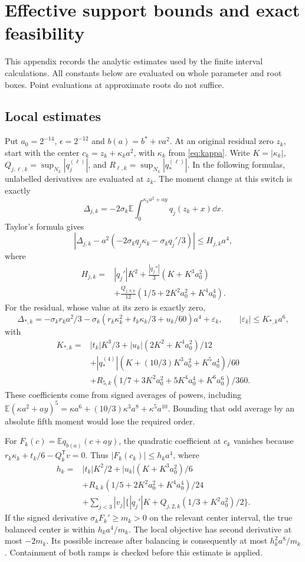 \section{Effective support bounds and exact feasibility}\label{app:effective}
This appendix records the analytic estimates used by the finite interval
calculations. All constants below are evaluated on whole parameter and root
boxes. Point evaluations at approximate roots do not suffice.

\subsection{Local estimates}
Put \(a_0=2^{-14}\), \(\epsilon=2^{-12}\) and
\(b(a)=b^*+va^2\). At an original residual zero \(z_k\), start with the
center \(c_k=z_k+\kappa_ka^2\), with \(\kappa_k\) from \eqref{eq:kappa}.
Write \(K=|\kappa_k|\),
\(Q_{j,\ell,k}=\sup_{N_k}|q_j^{(\ell)}|\), and
\(R_{\ell,k}=\sup_{N_k}|q_*^{(\ell)}|\).
In the following formulas, unlabelled derivatives are evaluated at \(z_k\).
The moment change at this switch is exactly
\[
 \Delta_{j,k}=-2\sigma_k\mathbb E
                 \int_0^{\kappa_ka^2+ay}q_j(z_k+x)\dd x .
\]
Taylor's formula gives
\[
 |\Delta_{j,k}-a^2(-2\sigma_kq_j\kappa_k-\sigma_kq_j'/3)|
                  \leq H_{j,k}a^4 ,
\]
where
\begin{align*}
 H_{j,k}={}&|q_j'|K^2
 +\frac{|q_j''|}{3}(K+K^3a_0^2)\\
 &+\frac{Q_{j,3,k}}{12}(1/5+2K^2a_0^2+K^4a_0^4).
\end{align*}
For the residual, whose value at its zero is exactly zero,
\[
 \Delta_{*,k}=-\sigma_kr_ka^2/3
 -\sigma_k(r_k\kappa_k^2+t_k\kappa_k/3+u_k/60)a^4+\varepsilon_k,
 \qquad |\varepsilon_k|\leq K_{*,k}a^6,
\]
with
\begin{align*}
 K_{*,k}={}&|t_k|K^3/3+|u_k|(2K^2+K^4a_0^2)/12\\
 &+|q_*^{(4)}|(K+(10/3)K^3a_0^2+K^5a_0^4)/60\\
 &+R_{5,k}(1/7+3K^2a_0^2+5K^4a_0^4+K^6a_0^6)/360 .
\end{align*}
These coefficients come from signed averages of powers, including
\(\mathbb E(\kappa a^2+ay)^5=\kappa a^6+(10/3)\kappa^3a^8+\kappa^5a^{10}\).
Bounding that odd average by an absolute fifth moment would lose the
required order.

For \(F_k(c)=\mathbb E q_{b(a)}(c+ay)\), the quadratic coefficient at
\(c_k\) vanishes because \(r_k\kappa_k+t_k/6-Q_k^{\mathsf T}v=0\).
Thus \(|F_k(c_k)|\leq h_ka^4\), where
\begin{align*}
 h_k={}&|t_k|K^2/2+|u_k|(K+K^3a_0^2)/6\\
 &+R_{4,k}(1/5+2K^2a_0^2+K^4a_0^4)/24\\
 &+\sum_{j<3}|v_j|\{
       |q_j'|K+Q_{j,2,k}(1/3+K^2a_0^2)/2\}.
\end{align*}
If the signed derivative \(\sigma_kF_k'\geq m_k>0\) on the relevant
center interval, the true balanced center is within \(h_ka^4/m_k\).
The local objective has second derivative at most \(-2m_k\).
Its possible increase after balancing is consequently at most
\(h_k^2a^8/m_k\). Containment of both ramps is checked before this
estimate is applied.

